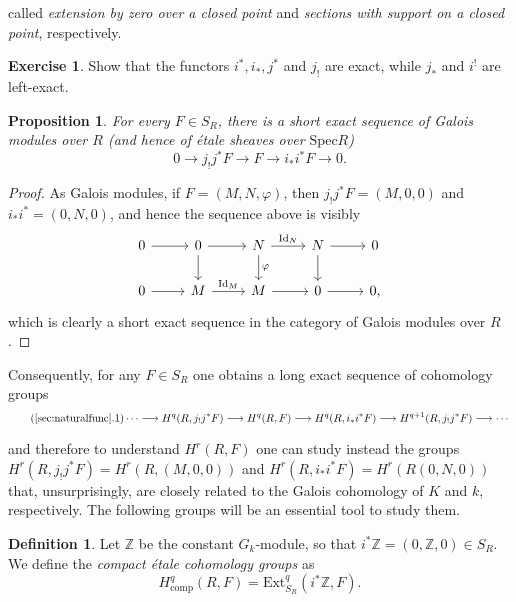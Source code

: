 \documentclass{article}
\newcommand{\ext}{\mathrm{Ext}}
\newcommand{\comp}{\mathrm{comp}}
\newcommand{\Spec}{\mathrm{Spec}}
\newcommand{\Id}{\mathrm{Id}}
\newcommand{\Z}{\mathbb{Z}}
\theoremstyle{plain}
\newtheorem{proposition}[theorem]{Proposition}
\theoremstyle{definition}
\newtheorem{definition}[theorem]{Definition}
\newtheorem*{exercise}{Exercise}
\begin{document}
    called \textit{extension by zero over a closed point} and \textit{sections with support on a closed point}, respectively.

    \begin{exercise}
        Show that the functors $i^*, i_*, j^*$ and $j_!$ are exact, while $j_*$ and $i^!$ are left-exact.
    \end{exercise}
    \begin{proposition}\label{prop:sesmodules}
        For every $F\in S_R$, there is a short exact sequence of Galois modules over $R$ (and hence of \'{e}tale sheaves over $\Spec R$)
        $$0\longrightarrow j_!j^*F\longrightarrow F\longrightarrow i_*i^*F\longrightarrow 0.$$
    \end{proposition}
    \begin{proof}
        As Galois modules, if $F=(M,N,\varphi)$, then $j_!j^*F=(M,0,0)$ and $i_*i^*=(0,N,0)$, and hence the sequence above is visibly
        \[
            \begin{tikzcd}
                0 \arrow[r,""] & 0 \arrow[r,""] \arrow[d,""] & N \arrow[r,"\Id_N"] \arrow[d,"\varphi"] & N \arrow[r,""] \arrow[d,""] & 0 \\
                0 \arrow[r,""] & M \arrow[r,"\Id_M"] & M \arrow[r,""] & 0 \arrow[r,""] & 0,
            \end{tikzcd}
        \]
        which is clearly a short exact sequence in the category of Galois modules over $R$.
    \end{proof}

    Consequently, for any $F\in S_R$ one obtains a long exact sequence of cohomology groups
    \begin{equation}\label{eqn:longexact}\tag{\ref{sec:naturalfunc}.1}
        \cdots\longrightarrow H^q(R,j_!j^*F)\longrightarrow H^q(R,F)\longrightarrow H^q(R,i_*i^*F)\longrightarrow H^{q+1}(R,j_!j^*F)\longrightarrow\cdots   
    \end{equation}

    and therefore to understand $H^r(R,F)$ one can study instead the groups $H^r(R,j_!j^*F)=H^r(R,(M,0,0))$ and $H^r(R,i_*i^*F)=H^r(R(0,N,0))$ that, unsurprisingly, are closely related to the Galois cohomology of $K$ and $k$, respectively. The following groups will be an essential tool to study them.

    \begin{definition}
        Let $\Z$ be the constant $G_k$-module, so that $i^*\Z=(0,\Z,0)\in S_R$. We define the \textit{compact \'{e}tale cohomology groups} as
        $$H^q_{\comp}(R,F)=\ext^q_{S_R}(i^*\Z,F).$$
    \end{definition}
\end{document}
